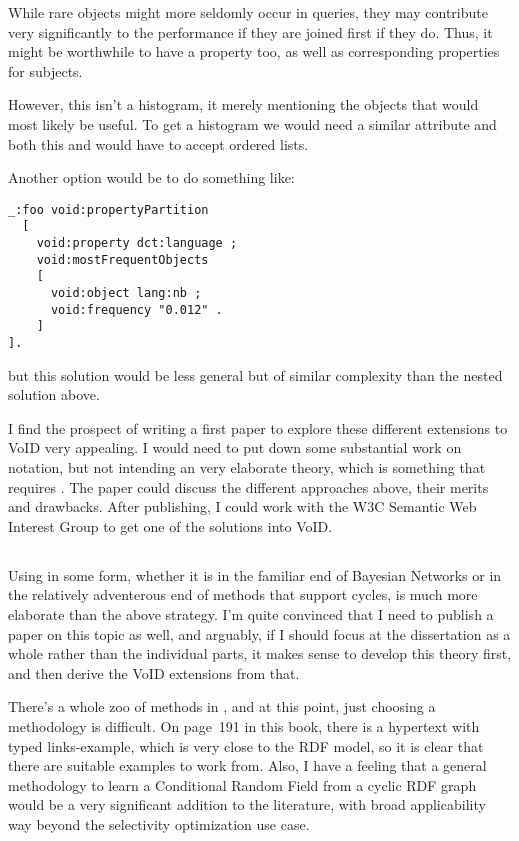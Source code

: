 While rare objects might more seldomly occur in queries, they may
contribute very significantly to the performance if they are joined
first if they do. Thus, it might be worthwhile to have a property
 too, as well as corresponding
properties for subjects.


However, this isn't a histogram, it merely mentioning the objects that
would most likely be useful. To get a histogram we would need a
similar  attribute and both this and
 would have to accept ordered
lists. 

Another option would be to do something like:
\begin{verbatim}
_:foo void:propertyPartition 
  [
    void:property dct:language ;
    void:mostFrequentObjects 
    [
      void:object lang:nb ;
      void:frequency "0.012" .
    ]
].
\end{verbatim}
but this solution would be less general but of similar complexity than
the nested solution above.

I find the prospect of writing a first paper to explore these different
extensions to VoID very appealing. I would need to put down some
substantial work on notation, but not intending an very elaborate
theory, which is something that requires \SRL. The paper could discuss
the different approaches above, their merits and drawbacks. After
publishing, I could work with the W3C Semantic Web Interest Group to
get one of the solutions into VoID.


\subsection{\SRL}

Using \SRL{} in some form, whether it is in the familiar end of
Bayesian Networks or in the relatively adventerous end of methods that
support cycles, is much more elaborate than the above strategy. I'm
quite convinced that I need to publish a paper on this topic as well,
and arguably, if I should focus at the dissertation as a whole rather
than the individual parts, it makes sense to develop this theory
first, and then derive the VoID extensions from that.

There's a whole zoo of methods in \cite{srlbook}, and at this point,
just choosing a methodology is difficult. On page~191 in this book,
there is a hypertext with typed links-example, which is very close to
the RDF model, so it is clear that there are suitable examples to work
from. Also, I have a feeling that a general methodology to learn a
Conditional Random Field from a cyclic RDF graph would be a very
significant addition to the literature, with broad applicability way
beyond the selectivity optimization use case.

